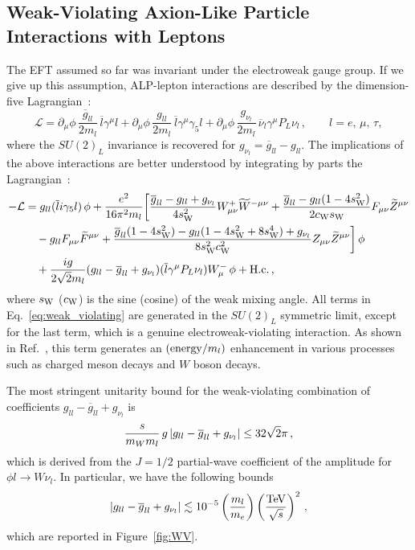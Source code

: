 \subsection{Weak-Violating Axion-Like Particle Interactions with Leptons}
%
The EFT assumed so far was invariant under the electroweak gauge group. If we give up this assumption, ALP-lepton interactions are described by the dimension-five 
Lagrangian~\cite{Altmannshofer:2022ckw}:
%
\begin{equation}
\mathcal{L} = \partial_\mu\phi\, \frac{\overline g_{ll }}{2m_l }\, \overline l  \gamma^\mu l  + \partial_\mu\phi\, \frac{g_{ll}}{2m_l}\, \overline l  \gamma^\mu \gamma_5 l  + \partial_\mu\phi\, \frac{g_{\nu _l }}{2m_l }\, \overline \nu_l \gamma^\mu P_L \nu_l \,,\qquad l = e,\, \mu,\, \tau,
\end{equation} 
%
where the $SU(2)_L$ invariance is recovered for $g_{\nu_l} = \overline g_{ll} - g_{ll}$. The implications of the above interactions are better understood by integrating by parts the Lagrangian~\cite{Altmannshofer:2022ckw}:
%
\begin{align}
-\mathcal{L} &= g_{ll} (\overline l i\gamma_5 l)\, \phi
+ \frac{ e ^2 }{ 16 \pi ^2 m _l } \bigg[ \frac{ \overline{g} _{ll} - 
g _{ll} + g _{\nu_l} }{ 4 s _{\rm W} ^2} W ^+ _{\mu\nu} \widetilde W ^{ {-}\mu \nu } \notag  + \frac{\overline{g} _{ll} - g _{ ll} ( 1 - 4  s _{\rm W} ^2 ) }{ 2 c _{\rm W} s _{\rm W} } F _{\mu\nu} \widetilde{Z} ^{\mu\nu}
\\
&\quad - g _{ll}  F _{\mu\nu} \widetilde{F} ^{\mu\nu} + \notag \frac{ \overline{g} _{ ll} ( 1 - 4 s _{\rm W} ^2 ) - g _{ll} ( 1 - 4 s _{\rm W} ^2 + 8 s _{\rm W} ^4 )  + g _{\nu _l } }{ 8 s _{\rm W} ^2 c _{\rm W} ^2 } Z _{\mu\nu} \widetilde{Z} ^{\mu\nu} \bigg] \,\phi \notag
\\
&\quad + \frac{ig}{2\sqrt{2} m _l }(g_{ll} - \overline g_{ll} + g_{\nu _l }) (\overline l \gamma^\mu P _L \nu_l) W_\mu^- \,\phi + \text{H.c.}\,, 
\label{eq:weak_violating}
\end{align}
%
where $s_{\rm W}$ ($c_{\rm W}$) is the sine (cosine) of the weak mixing angle.
All terms in Eq.~\eqref{eq:weak_violating} are generated 
in the $SU(2)_L$ symmetric limit, except for the last term, which is a genuine electroweak-violating interaction.
As shown in Ref.~\cite{Altmannshofer:2022ckw}, this term generates
an $ ({\rm energy} / m_l )$ enhancement in various processes such as charged meson decays and $W$ boson decays.

The most stringent unitarity bound for the weak-violating combination of coefficients $g_{ll}-\overline g_{ll} + g_{\nu_l}$ is
%
\begin{equation}\label{eq:WV_bounds}
    \frac{s}{m_W m_l}\, g\, \abs{g_{ll}-\overline g_{ll} + g_{\nu_l}} \le 32\sqrt{2}\pi\,,
\end{equation}
%
which is derived from the $J=1/2$ partial-wave coefficient of the amplitude for $\phi l \to W \nu_l$.
In particular, we have the following bounds
%
%
\begin{equation}
    \abs{g_{ll}-\overline g_{ll} + g_{\nu_l}} \lesssim 10^{-5} \left(\frac{m_l}{m_e}\right)
    \left(\frac{\text{TeV}}{\sqrt{s}}\right)^2\,,
\end{equation}
%
which are reported in Figure~\ref{fig:WV}.

